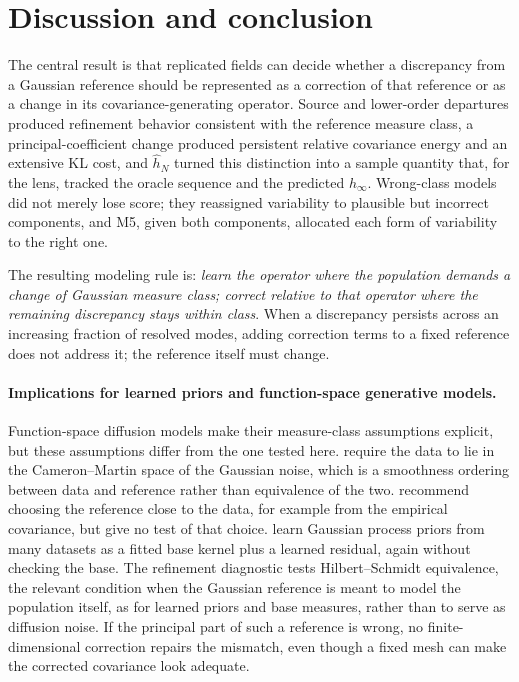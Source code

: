 \documentclass[11pt]{article}
\numberwithin{table}{section}
\numberwithin{figure}{section}
\begin{document}
\FloatBarrier
\section{Discussion and conclusion}
\label{sec:discussion}

The central result is that replicated fields can decide whether a discrepancy from a Gaussian reference should be represented as a correction of that reference or as a change in its covariance-generating operator. Source and lower-order departures produced refinement behavior consistent with the reference measure class, a principal-coefficient change produced persistent relative covariance energy and an extensive KL cost, and $\widehat h_N$ turned this distinction into a sample quantity that, for the lens, tracked the oracle sequence and the predicted $h_\infty$. Wrong-class models did not merely lose score; they reassigned variability to plausible but incorrect components, and M5, given both components, allocated each form of variability to the right one.

The resulting modeling rule is: \emph{learn the operator where the population demands a change of Gaussian measure class; correct relative to that operator where the remaining discrepancy stays within class}. When a discrepancy persists across an increasing fraction of resolved modes, adding correction terms to a fixed reference does not address it; the reference itself must change.

\paragraph{Implications for learned priors and function-space generative models.}
Function-space diffusion models make their measure-class assumptions explicit, but these assumptions differ from the one tested here. \citet[Sec.~4.1]{Lim2025} require the data to lie in the Cameron--Martin space of the Gaussian noise, which is a smoothness ordering between data and reference rather than equivalence of the two. \citet[Secs.~6.1.1 and 7.1]{Pidstrigach2024} recommend choosing the reference close to the data, for example from the empirical covariance, but give no test of that choice. \citet{Lin2026} learn Gaussian process priors from many datasets as a fitted base kernel plus a learned residual, again without checking the base. The refinement diagnostic tests Hilbert--Schmidt equivalence, the relevant condition when the Gaussian reference is meant to model the population itself, as for learned priors and base measures, rather than to serve as diffusion noise. If the principal part of such a reference is wrong, no finite-dimensional correction repairs the mismatch, even though a fixed mesh can make the corrected covariance look adequate.
\end{document}
